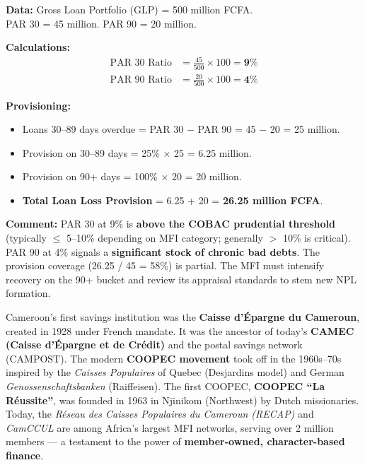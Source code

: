 \documentclass[11pt]{article}
\begin{document}
\begin{corrige}
\textbf{Data:} Gross Loan Portfolio (GLP) = 500 million FCFA. \\
PAR 30 = 45 million. PAR 90 = 20 million.

\textbf{Calculations:}
\begin{align*}
\text{PAR 30 Ratio} &= \frac{45}{500} \times 100 = \mathbf{9\%} \\
\text{PAR 90 Ratio} &= \frac{20}{500} \times 100 = \mathbf{4\%}
\end{align*}

\textbf{Provisioning:}
\begin{itemize}
    \item Loans 30--89 days overdue = PAR 30 $-$ PAR 90 = 45 $-$ 20 = 25 million.
    \item Provision on 30--89 days = 25\% $\times$ 25 = 6.25 million.
    \item Provision on 90+ days = 100\% $\times$ 20 = 20 million.
    \item \textbf{Total Loan Loss Provision} = 6.25 + 20 = \textbf{26.25 million FCFA}.
\end{itemize}

\textbf{Comment:} PAR 30 at 9\% is \textbf{above the COBAC prudential threshold} (typically $\le$ 5--10\% depending on MFI category; generally $>$ 10\% is critical). PAR 90 at 4\% signals a \textbf{significant stock of chronic bad debts}. The provision coverage (26.25 / 45 = 58\%) is partial. The MFI must intensify recovery on the 90+ bucket and review its appraisal standards to stem new NPL formation.
\end{corrige}

\begin{savaistu}
Cameroon's first savings institution was the \textbf{Caisse d'Épargne du Cameroun}, created in 1928 under French mandate. It was the ancestor of today's \textbf{CAMEC (Caisse d'Épargne et de Crédit)} and the postal savings network (CAMPOST). The modern \textbf{COOPEC movement} took off in the 1960s–70s inspired by the \emph{Caisses Populaires} of Quebec (Desjardins model) and German \emph{Genossenschaftsbanken} (Raiffeisen). The first COOPEC, \textbf{COOPEC ``La Réussite''}, was founded in 1963 in Njinikom (Northwest) by Dutch missionaries. Today, the \emph{Réseau des Caisses Populaires du Cameroun (RECAP)} and \emph{CamCCUL} are among Africa's largest MFI networks, serving over 2 million members — a testament to the power of \textbf{member-owned, character-based finance}.
\end{savaistu}
\end{document}
